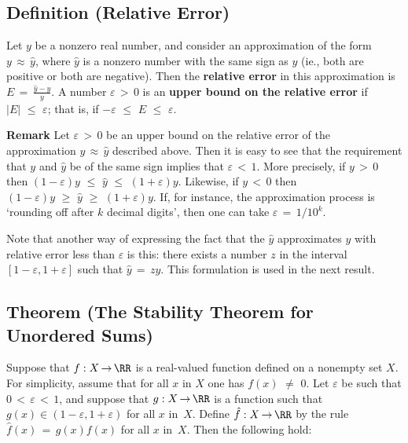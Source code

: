 \V

            \subsection{\small{\bf Definition} (Relative Error)}
            \label{DefG20.135}

\V

        Let $y$ be a nonzero real number, and consider an approximation of the form $y \,{\approx}\, \hat{y}$,
    where $\hat{y}$ is a nonzero number with the same sign as $y$ (ie., both are positive or both are negative).
    Then the {\bf relative error} in this approximation is $E \,=\, {\displaystyle \frac{\hat{y}-y}{y}}$.
    A number ${\varepsilon}\,>\,0$ is an {\bf upper bound on the relative error} if $|E|\,\,{\leq}\,\,{\varepsilon}$; that is, if $-{\varepsilon}\,\,{\leq}\,\,E\,\,{\leq}\,\,{\varepsilon}$.

\V
\V

        {\bf Remark} Let ${\varepsilon}\,>\,0$ be an upper bound on the relative error of the approximation $y \,{\approx}\, \hat{y}$ described above.
    Then it is easy to see that the requirement that $y$ and $\hat{y}$ be of the same sign implies that ${\varepsilon}\,<\,1$.
    More precisely, if $y\,>\,0$ then $(1-{\varepsilon})y\,\,{\leq}\,\,\hat{y}\,\,{\leq}\,\,(1+{\varepsilon})y$.
    Likewise, if $y\,<\,0$ then $(1-{\varepsilon})y\,\,{\geq}\,\,\hat{y}\,\,{\geq}\,\,(1+{\varepsilon})y$.
    If, for instance, the approximation process is `rounding off after $k$ decimal digits',
    then one can take ${\varepsilon} \,=\, 1/10^{k}$.

        Note that another way of expressing the fact that the $\hat{y}$ approximates $y$ with relative error less than ${\varepsilon}$ is this:
    there exists a number $z$ in the interval $[1-{\varepsilon},1+{\varepsilon}]$ such that $\hat{y} \,=\, zy$.
    This formulation is used in the next result.

\V
\V

            \subsection{\small{\bf Theorem} (The Stability Theorem for Unordered Sums)}
            \label{ThmG20.140}

\V

        Suppose that $f:X \,{\rightarrow}\, {\RR}$ is a real-valued function defined on a nonempty set $X$.
    For simplicity, assume that for all $x$ in $X$ one has $f(x) \,\,{\neq}\,\, 0$.
    Let ${\varepsilon}$ be such that $0\,<\,{\varepsilon}\,<\,1$, and suppose that $g:X \,{\rightarrow}\, {\RR}$ is a function such that $g(x){\in}(1-{\varepsilon},1+{\varepsilon})$ for all $x$ in~$X$.
    Define $\hat{f}:X \,{\rightarrow}\, {\RR}$ by the rule $\hat{f}(x) \,=\, g(x)f(x)$ for all $x$ in~$X$. Then the following hold:

